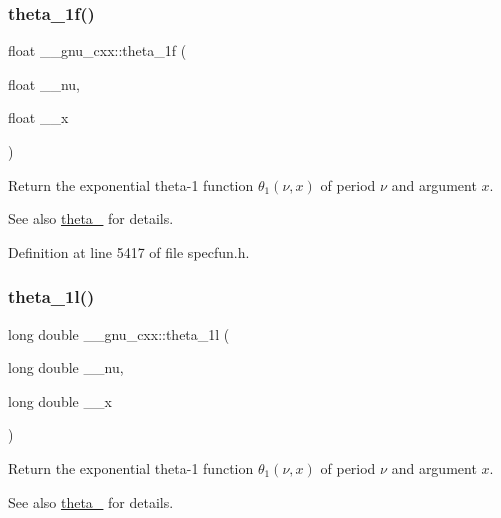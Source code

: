 \subsubsection{\texorpdfstring{theta\+\_\+1f()}{theta\_1f()}}
{\footnotesize\ttfamily float \+\_\+\+\_\+gnu\+\_\+cxx\+::theta\+\_\+1f (\begin{DoxyParamCaption}\item[{float}]{\+\_\+\+\_\+nu,  }\item[{float}]{\+\_\+\+\_\+x }\end{DoxyParamCaption})\hspace{0.3cm}{\ttfamily [inline]}}

Return the exponential theta-\/1 function $ \theta_1(\nu,x) $ of period $ \nu $ and argument $ x $.

\begin{DoxySeeAlso}{See also}
\hyperlink{group__gnu__math__spec__func_gaa2e5a3a5f550fe032a596a8b01c878c0}{theta\+\_} for details. 
\end{DoxySeeAlso}


Definition at line 5417 of file specfun.\+h.

\mbox{\label{group__gnu__math__spec__func_ga3520684c78771ffa57180060c8b6d1ca}} 
\subsubsection{\texorpdfstring{theta\+\_\+1l()}{theta\_1l()}}
{\footnotesize\ttfamily long double \+\_\+\+\_\+gnu\+\_\+cxx\+::theta\+\_\+1l (\begin{DoxyParamCaption}\item[{long double}]{\+\_\+\+\_\+nu,  }\item[{long double}]{\+\_\+\+\_\+x }\end{DoxyParamCaption})\hspace{0.3cm}{\ttfamily [inline]}}

Return the exponential theta-\/1 function $ \theta_1(\nu,x) $ of period $ \nu $ and argument $ x $.

\begin{DoxySeeAlso}{See also}
\hyperlink{group__gnu__math__spec__func_gaa2e5a3a5f550fe032a596a8b01c878c0}{theta\+\_} for details. 
\end{DoxySeeAlso}



